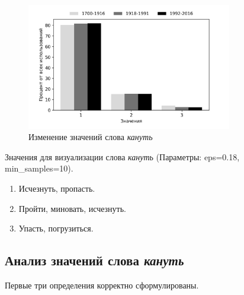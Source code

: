 %

\begin{figure}[H]
	\centering
	\includegraphics[width=0.8\textwidth]{img/visualizations/kanut'_minimal}
	\caption{Изменение значений слова \textit{кануть}}
	\label{fig:Кануть}
\end{figure}

Значения для визуализации слова \textit{кануть} (Параметры: eps=0.18, min\_samples=10).

\begin{enumerate}
    \item Исчезнуть, пропасть.
    \item Пройти, миновать, исчезнуть.
    \item Упасть, погрузиться.
\end{enumerate}

\subsection*{Анализ значений слова \textit{кануть}}

Первые три определения корректно сформулированы.

